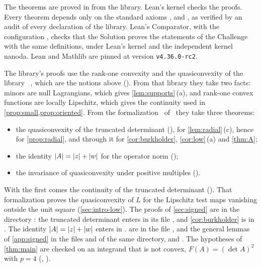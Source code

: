 {\sloppy
The theorems are proved in  from the library.
Lean's kernel checks the proofs. Every theorem depends only on the standard axioms ,
 and , as verified by an audit of every declaration of
the library. Lean's Comparator, with the configuration
, checks that the Solution proves the
statements of the Challenge with the same definitions, under Lean's kernel and the independent
kernel nanoda. Lean and Mathlib are pinned at version \texttt{v4.36.0-rc2}.\par}

\begin{sloppypar}
The library's proofs use the rank-one convexity and the quasiconvexity of the library
~\cite{CoVLean}, which are the notions above
(). From that library they take two facts: minors
are null Lagrangians, which gives \cref{lem:supports}\,(a), and rank-one convex functions are
locally Lipschitz, which gives the continuity used in \cref{prop:small,prop:oriented}. From the
formalization~\cite{IwaniecLean} of~\cite{SharpHI} they take three theorems:
\end{sloppypar}
\begin{itemize}
\item the quasiconvexity of the truncated determinant (),
  for \cref{lem:radial}\,(c), hence for \cref{prop:radial}, and through it for
  \cref{cor:burkholder}, \cref{cor:low}\,(a) and \cref{thm:A};
\item the identity $\lvert A\rvert=\lvert z\rvert+\lvert w\rvert$ for the operator norm ();
\item the invariance of quasiconvexity under positive multiples
  ().
\end{itemize}
\begin{sloppypar}
\noindent With the first comes the continuity of the truncated determinant
(). That formalization proves the quasiconvexity of $L$ for the
Lipschitz test maps vanishing outside the unit square (\cref{sec:intro-low}). The proofs of
\cref{sec:signed} are in the directory : the truncated
determinant enters in its file , and \cref{cor:burkholder} is in
. The identity $\lvert A\rvert=\lvert z\rvert+\lvert w\rvert$ enters in
.
 are in the file
, and the general lemmas of
\cref{app:signed} in the files  and  of the
same directory, 
and . The hypotheses of
\cref{thm:main} are checked on an integrand that is not convex, $F(A)=(\det A)^2$ with $p=4$
(, ).
\end{sloppypar}

